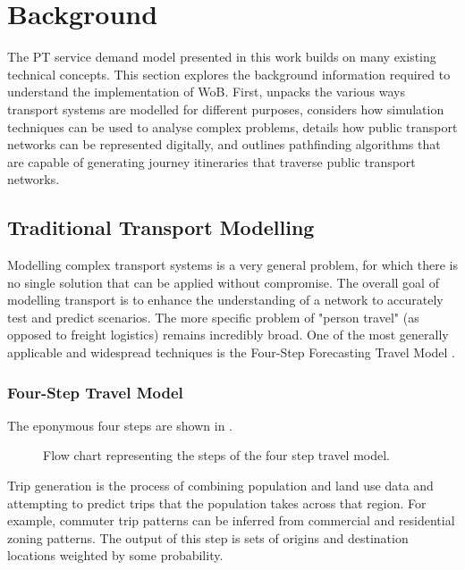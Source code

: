 \chapter{Background}
\label{chap:Background}

The PT service demand model presented in this work builds on many existing technical concepts. This section explores the background information required to understand the implementation of WoB. First,  unpacks the various ways transport systems are modelled for different purposes,  considers how simulation techniques can be used to analyse complex problems,  details how public transport networks can be represented digitally, and  outlines pathfinding algorithms that are capable of generating journey itineraries that traverse public transport networks.  

\section{Traditional Transport Modelling}
\label{sec:TransportModelling}
Modelling complex transport systems is a very general problem, for which there is no single solution that can be applied without compromise. The overall goal of modelling transport is to enhance the understanding of a network to accurately test and predict scenarios. The more specific problem of "person travel" (as opposed to freight logistics) remains incredibly broad. One of the most generally applicable and widespread techniques is the Four-Step Forecasting Travel Model \cite{mcnallyFourStepModel2007}.

\subsection{Four-Step Travel Model}
The eponymous four steps are shown in .
\begin{figure}[ht]
    \centering
    
        \caption{Flow chart representing the steps of the four step travel model.}
    \label{fig:four_step_model}
\end{figure}

\pagebreak
Trip generation is the process of combining population and land use data and attempting to predict trips that the population takes across that region. For example, commuter trip patterns can be inferred from commercial and residential zoning patterns. The output of this step is sets of origins and destination locations weighted by some probability. 

